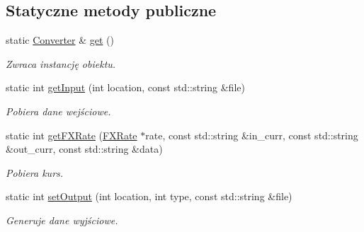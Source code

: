 \subsection*{\-Statyczne metody publiczne}
\begin{DoxyCompactItemize}
\item 
static \hyperlink{class_converter}{\-Converter} \& \hyperlink{class_converter_a0dbd32eeac6a1b52fdf4a9f42e55c110}{get} ()
\begin{DoxyCompactList}\small\item\em \-Zwraca instancję obiektu. \end{DoxyCompactList}\item 
static int \hyperlink{class_converter_a6a2bb96d0b8d1dd5ebbe4685cec6f203}{get\-Input} (int location, const std\-::string \&file)
\begin{DoxyCompactList}\small\item\em \-Pobiera dane wejściowe. \end{DoxyCompactList}\item 
static int \hyperlink{class_converter_aff1b8d27be5c69b531d10f8451e07ca0}{get\-F\-X\-Rate} (\hyperlink{class_f_x_rate}{\-F\-X\-Rate} $\ast$rate, const std\-::string \&in\-\_\-curr, const std\-::string \&out\-\_\-curr, const std\-::string \&data)
\begin{DoxyCompactList}\small\item\em \-Pobiera kurs. \end{DoxyCompactList}\item 
static int \hyperlink{class_converter_aa74b89ae3f4652130726fb64ce970020}{set\-Output} (int location, int type, const std\-::string \&file)
\begin{DoxyCompactList}\small\item\em \-Generuje dane wyjściowe. \end{DoxyCompactList}\end{DoxyCompactItemize}
